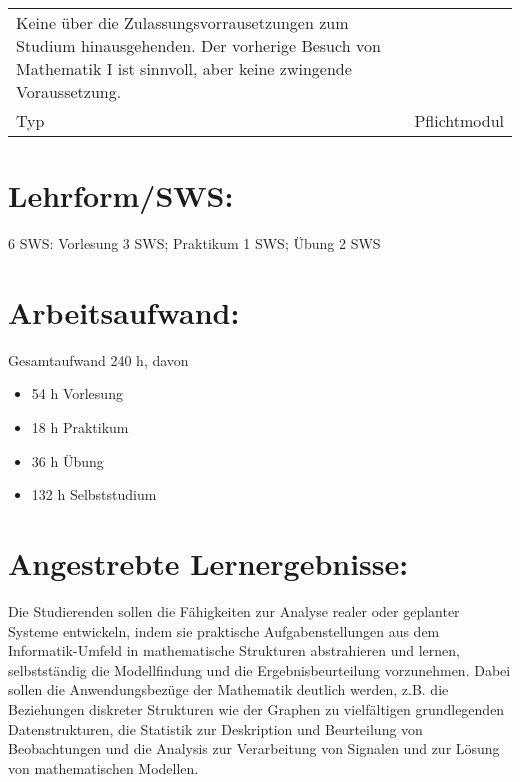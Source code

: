 \begin{longtable}[]{@{}ll@{}}
\begin{minipage}[t]{0.12\columnwidth}
Keine über die Zulassungsvorrausetzungen zum Studium hinausgehenden. Der
vorherige Besuch von Mathematik I ist sinnvoll, aber keine zwingende
Voraussetzung.\strut
\end{minipage}\tabularnewline
\begin{minipage}[t]{0.12\columnwidth}\raggedright\strut
Typ\strut
\end{minipage} & \begin{minipage}[t]{0.12\columnwidth}\raggedright\strut
Pflichtmodul\strut
\end{minipage}\tabularnewline
\bottomrule
\end{longtable}

\section*{Lehrform/SWS:}\label{lehrformsws-14}

6 SWS: Vorlesung 3 SWS; Praktikum 1 SWS; Übung 2 SWS

\section*{Arbeitsaufwand:}\label{arbeitsaufwand-13}

Gesamtaufwand 240 h, davon

\begin{itemize}
\item
  54 h Vorlesung
\item
  18 h Praktikum
\item
  36 h Übung
\item
  132 h Selbststudium
\end{itemize}

\section*{Angestrebte
Lernergebnisse:}\label{angestrebte-lernergebnisse-14}

Die Studierenden sollen die Fähigkeiten zur Analyse realer oder
geplanter Systeme entwickeln, indem sie praktische Aufgabenstellungen
aus dem Informatik-Umfeld in mathematische Strukturen abstrahieren und
lernen, selbstständig die Modellfindung und die Ergebnisbeurteilung
vorzunehmen. Dabei sollen die Anwendungsbezüge der Mathematik deutlich
werden, z.B. die Beziehungen diskreter Strukturen wie der Graphen zu
vielfältigen grundlegenden Datenstrukturen, die Statistik zur
Deskription und Beurteilung von Beobachtungen und die Analysis zur
Verarbeitung von Signalen und zur Lösung von mathematischen Modellen.

